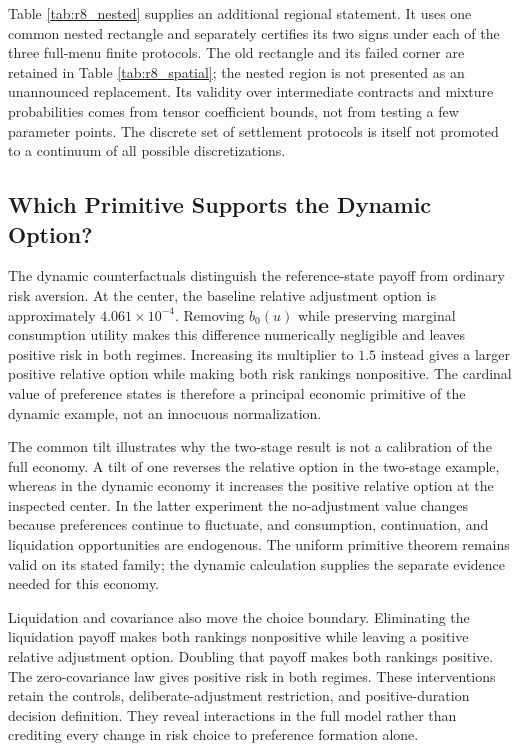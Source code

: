
Table \ref{tab:r8_nested} supplies an additional regional statement. It uses one common nested rectangle and separately certifies its two signs under each of the three full-menu finite protocols. The old rectangle and its failed corner are retained in Table \ref{tab:r8_spatial}; the nested region is not presented as an unannounced replacement. Its validity over intermediate contracts and mixture probabilities comes from tensor coefficient bounds, not from testing a few parameter points. The discrete set of settlement protocols is itself not promoted to a continuum of all possible discretizations.

\subsection{Which Primitive Supports the Dynamic Option?}

The dynamic counterfactuals distinguish the reference-state payoff from ordinary risk aversion. At the center, the baseline relative adjustment option is approximately $4.061\times10^{-4}$. Removing $b_0(u)$ while preserving marginal consumption utility makes this difference numerically negligible and leaves positive risk in both regimes. Increasing its multiplier to $1.5$ instead gives a larger positive relative option while making both risk rankings nonpositive. The cardinal value of preference states is therefore a principal economic primitive of the dynamic example, not an innocuous normalization.

The common tilt illustrates why the two-stage result is not a calibration of the full economy. A tilt of one reverses the relative option in the two-stage example, whereas in the dynamic economy it increases the positive relative option at the inspected center. In the latter experiment the no-adjustment value changes because preferences continue to fluctuate, and consumption, continuation, and liquidation opportunities are endogenous. The uniform primitive theorem remains valid on its stated family; the dynamic calculation supplies the separate evidence needed for this economy.

Liquidation and covariance also move the choice boundary. Eliminating the liquidation payoff makes both rankings nonpositive while leaving a positive relative adjustment option. Doubling that payoff makes both rankings positive. The zero-covariance law gives positive risk in both regimes. These interventions retain the controls, deliberate-adjustment restriction, and positive-duration decision definition. They reveal interactions in the full model rather than crediting every change in risk choice to preference formation alone.

